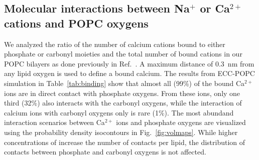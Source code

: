 \documentclass[journal=jpcbfk,manuscript=article]{achemso}
\begin{document}
\subsection{Molecular interactions between Na$^+$ or Ca$^{2+}$ cations and POPC oxygens}
We analyzed the ratio of the number of calcium cations bound to either phosphate or carbonyl moieties and the total number of bound cations in our POPC bilayers as done previously in Ref.~. A maximum distance of 0.3~nm from any lipid oxygen is used to define a bound calcium. The results from ECC-POPC simulation in Table~\ref{tab:binding} show that almost all (99\%) of the bound Ca$^{2+}$ ions are in direct contact with phosphate oxygens. From these ions, only one third (32\%) also interacts with the carbonyl oxygens, while the interaction of calcium ions with carbonyl oxygens only is rare (1\%). The most abundand interaction scenarios between Ca$^{2+}$ ions and phosphate oxygens are visualized using the probability density isocontours in Fig.~\ref{fig:volmaps}. While higher concentrations of  increase the number of contacts per lipid, the distribution of contacts between phosphate and carbonyl oxygens is not affected.
\end{document}
